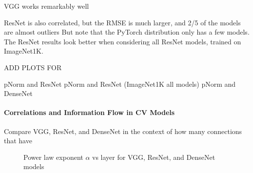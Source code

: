 VGG works remarkably well

ResNet is also correlated, but the RMSE is much larger, and 2/5 of the models are almost outliers
But note that the PyTorch distribution only has a few models.
The ResNet results look better when considering all ResNet models, trained on ImageNet1K.

ADD PLOTS FOR

pNorm and ResNet
pNorm and ResNet (ImageNet1K all models)
pNorm and DenseNet


\paragraph{Correlations and Information Flow in CV Models}

Compare VGG, ResNet, and DenseNet in the context of how many connections that have

\begin{figure}[t]
    \centering

    \qquad
    \qquad
    \caption{Power law exponent $\alpha$ vs layer for VGG, ResNet, and DenseNet models}
    \label{fig:vgg-alpha-layers}
\end{figure}


